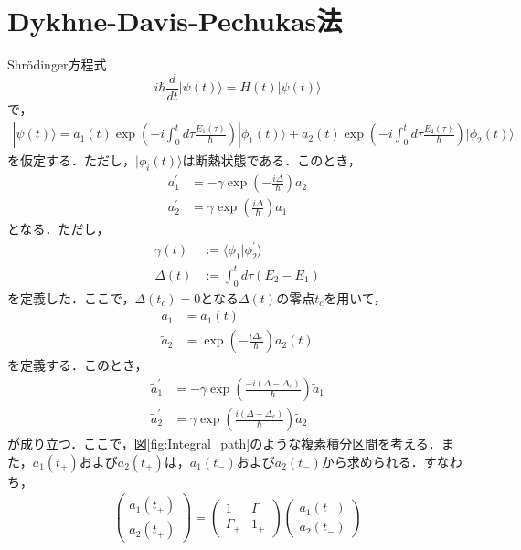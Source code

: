 \documentclass[a4paper, titlepage]{jsreport}
\begin{document}
\chapter{Dykhne-Davis-Pechukas法}
Shr\"{o}dinger方程式
\begin{equation}
  i\hbar \frac{d}{dt} |\psi(t) \rangle = H(t) |\psi(t) \rangle
\end{equation}
で，
\begin{align}
  |\psi(t) \rangle = a_1(t) \exp \left(-i \int_0^t d\tau \frac{E_1(\tau)}{\hbar} \right) |\phi_1(t)\rangle + a_2(t) \exp \left(-i \int_0^t d\tau \frac{E_2(\tau)}{\hbar} \right) |\phi_2(t)\rangle
\end{align}
を仮定する．ただし，$|\phi_i(t)\rangle$は断熱状態である．このとき，
\begin{align}
  a_1^{\prime} &= -\gamma \exp \left( -\frac{i\Delta}{\hbar} \right) a_2\\
  a_2^{\prime} &= \gamma \exp \left( \frac{i\Delta}{\hbar} \right) a_1
\end{align}
となる．ただし，
\begin{align}
  \gamma(t) &:= \langle \phi_1 | \phi_2^{\prime} \rangle\\
  \Delta(t) &:= \int_0^t d\tau (E_2 - E_1)
\end{align}
を定義した．ここで，$\Delta(t_c) = 0$となる$\Delta(t)$の零点$t_c$を用いて，
\begin{align}
  \tilde{a}_1 &= a_1(t)\\
  \tilde{a}_2 &= \exp \left( - \frac{i\Delta_c}{\hbar} \right) a_2(t)
\end{align}
を定義する．このとき，
\begin{align}
  \tilde{a}_1^{\prime} &= -\gamma \exp \left( \frac{-i (\Delta - \Delta_c)}{\hbar} \right) \tilde{a}_1\\
  \tilde{a}_2^{\prime} &= \gamma \exp \left( \frac{i (\Delta - \Delta_c)}{\hbar} \right) \tilde{a}_2
\end{align}
が成り立つ．ここで，図\ref{fig:Integral_path}のような複素積分区間を考える．また，$a_1(t_+)$および$a_2(t_+)$は，$a_1(t_-)$および$a_2(t_-)$から求められる．すなわち，
\begin{align}
  \begin{pmatrix}
    a_1(t_+)\\
    a_2(t_+)
  \end{pmatrix}
  =
  \begin{pmatrix}
    1_- & \Gamma_-\\
    \Gamma_+ & 1_+
  \end{pmatrix}
  \begin{pmatrix}
    a_1(t_-)\\
    a_2(t_-)
  \end{pmatrix} \label{Appendix_TM}
\end{align}
\end{document}
